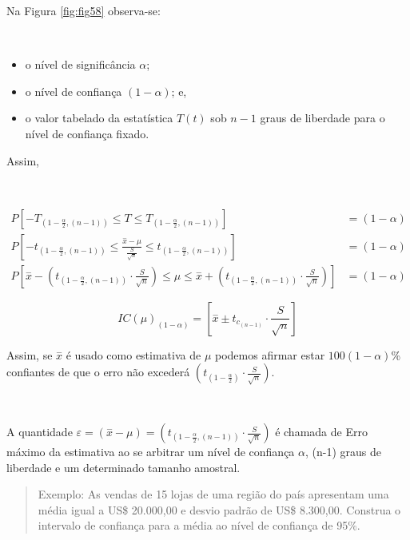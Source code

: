 \documentclass[
]{book}
\providecommand{\tightlist}{%
  \setlength{\itemsep}{0pt}\setlength{\parskip}{0pt}}
\begin{document}
\hfill\break

Na Figura \ref{fig:fig58} observa-se:

~

\begin{itemize}
\tightlist
\item
  o nível de significância \(\alpha\);\\
\item
  o nível de confiança \((1-\alpha)\); e,\\
\item
  o valor tabelado da estatística \(T(t)\) sob \(n-1\) graus de liberdade para o nível de confiança fixado.
\end{itemize}

\hfill\break

Assim,

~

\begin{align*}
P\left[-{T}_{(1-\frac{\alpha }{2}, (n-1))}\le T \le {T }_{(1-\frac{\alpha }{2}, (n-1))}\right] & = (1-\alpha) \\
P\left[-{t}_{(1-\frac{\alpha }{2}, (n-1))}\le \frac{\stackrel{-}{x}-\mu }{\frac{S}{\sqrt{n}}}
\le {t}_{(1-\frac{\alpha }{2}, (n-1))}\right] & = (1-\alpha) \\
P[\stackrel{-}{x}-({t}_{(1-\frac{\alpha }{2}, (n-1))} \cdot \frac{S}{\sqrt{n}}) \le \mu \le \stackrel{-}{x}+({t}_{(1-\frac{\alpha }{2}, (n-1))} \cdot \frac{S}{\sqrt{n}})     ] & = (1-\alpha) 
\end{align*}

\[
IC(\mu)_{(1-\alpha)}= [\stackrel{-}{x} \pm {t}_{c_{(n-1)}} \cdot \frac{S}{\sqrt{n}}] 
\]

\hfill\break

Assim, se \(\stackrel{-}{x}\) é usado como estimativa de \(\mu\) podemos afirmar estar \(100(1-\alpha)\)\% confiantes de que o erro não excederá \(({t}_{(1-\frac{\alpha }{2})} \cdot \frac{S}{\sqrt{n}})\).

~

A quantidade \(\varepsilon=(\stackrel{-}{x}-\mu)= ({t}_{(1-\frac{\alpha }{2}, (n-1))} \cdot \frac{S}{\sqrt{n}})\) é chamada de Erro máximo da estimativa ao se arbitrar um nível de confiança \(\alpha\), (n-1) graus de liberdade e um determinado tamanho amostral.

\hfill\break

\begin{quote}
Exemplo: As vendas de 15 lojas de uma região do país apresentam uma média igual a US\$ 20.000,00 e desvio padrão de US\$ 8.300,00. Construa o intervalo de confiança para a média ao nível de confiança de 95\%.
\end{quote}
\end{document}
